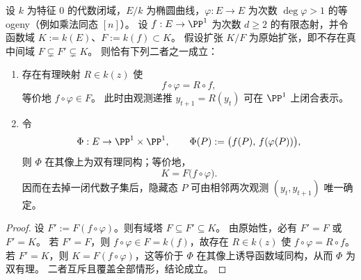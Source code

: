 \begin{theorem}[原始覆盖下的双时刻可观测二歧]\label{thm:pom-elliptic-two-time-observability-dichotomy}
设 \(k\) 为特征 \(0\) 的代数闭域，\(E/k\) 为椭圆曲线，\(\varphi:E\to E\) 为次数 \(\deg\varphi>1\) 的等ogeny（例如乘法同态 \([n]\)）。
设 \(f:E\to \PP^{1}\) 为次数 \(d\ge 2\) 的有限态射，并令函数域 \(K:=k(E)\)、\(F:=k(f)\subset K\)。
假设扩张 \(K/F\) 为原始扩张，即不存在真中间域 \(F\subsetneq F'\subsetneq K\)。
则恰有下列二者之一成立：
\begin{enumerate}
  \item 存在有理映射 \(R\in k(z)\) 使
  \[
  f\circ\varphi = R\circ f,
  \]
  等价地 \(f\circ\varphi\in F\)。
  此时由观测递推 \(y_{t+1}=R(y_t)\) 可在 \(\PP^1\) 上闭合表示。
  \item 令
  \[
  \Phi:E\to \PP^{1}\times\PP^{1},\qquad \Phi(P):=\bigl(f(P),\,f(\varphi(P))\bigr),
  \]
  则 \(\Phi\) 在其像上为双有理同构；等价地，
  \[
  K = F\bigl(f\circ\varphi\bigr).
  \]
  因而在去掉一闭代数子集后，隐藏态 \(P\) 可由相邻两次观测 \((y_t,y_{t+1})\) 唯一确定。
\end{enumerate}
\end{theorem}
\begin{proof}
设 \(F':=F(f\circ\varphi)\)。则有域塔 \(F\subseteq F'\subseteq K\)。
由原始性，必有 \(F'=F\) 或 \(F'=K\)。
若 \(F'=F\)，则 \(f\circ\varphi\in F=k(f)\)，故存在 \(R\in k(z)\) 使 \(f\circ\varphi=R\circ f\)。
若 \(F'=K\)，则 \(K=F(f\circ\varphi)\)，这等价于 \(\Phi\) 在其像上诱导函数域同构，从而 \(\Phi\) 为双有理。
二者互斥且覆盖全部情形，结论成立。
\end{proof}

